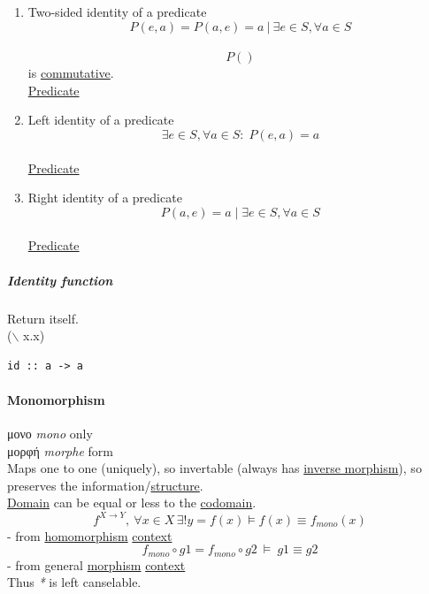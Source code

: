 \documentclass[11pt]{article}
\begin{document}
\begin{enumerate}
\item \label{orgf573952}Two-sided identity of a predicate
\label{sec:org94be7fe}
$$ P(e,a)=P(a,e)=a \ | \ \exists e \in S, \forall a \in S $$\\
$$ P() $$ is \hyperref[orgcb2a02d]{commutative}.\\

\hyperref[orgf52abe4]{Predicate}\\

\item \label{org9b0d890}Left identity of a predicate
\label{sec:org4ec8f33}
$$ \exists e \in S, \forall a \in S : \; P(e,a)=a $$\\

\hyperref[orgf52abe4]{Predicate}\\

\item \label{org41084d0}Right identity of a predicate
\label{sec:org9a1faeb}
$$  P(a,e)=a \; | \; \exists e \in S, \forall a \in S $$\\

\hyperref[orgf52abe4]{Predicate}\\
\end{enumerate}

\subparagraph{\label{org3d2bfd7}Identity function}
\label{sec:org881692e}
Return itself.\\
($\backslash$ x.x)\\
\begin{verbatim}
id :: a -> a
\end{verbatim}

\paragraph{\label{orgdcfcc77}Monomorphism}
\label{sec:org49bff35}
μονο \emph{mono} only\\
μορφή \emph{morphe} form\\

Maps one to one (uniquely), so invertable (always has \hyperref[org0378381]{inverse morphism}), so preserves the information/\hyperref[org93ee82c]{structure}.\\
\hyperref[orgf784585]{Domain} can be equal or less to the \hyperref[orgee70232]{codomain}.\\

$$ f^{X \to Y}, \ \forall x \in X \, \exists! y=f(x) \vDash f(x) \equiv f_{mono}(x) $$ - from \hyperref[org01da5b8]{homomorphism} \hyperref[orgd623681]{context}\\
$$ f_{mono} \circ g1 = f_{mono} \circ g2 \ \vDash \ g1 \equiv g2 $$ - from general \hyperref[orgad99fc6]{morphism} \hyperref[orgd623681]{context}\\
Thus \emph{*} is left canselable.\\
\end{document}
